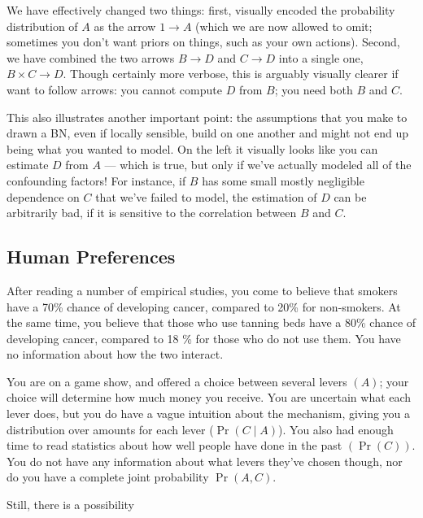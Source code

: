 \documentclass{article}
\begin{document}
	We have effectively changed two things: first, visually encoded the probability distribution of $A$ as the arrow $1 \to A$ (which we are now allowed to omit; sometimes you don't want priors on things, such as your own actions). Second, we have combined the two arrows $B \to D$ and $C \to D$ into a single one, $B \times C \to D$. Though certainly more verbose, this is arguably visually clearer if want to follow arrows: you cannot compute $D$ from $B$; you need both $B$ and $C$.
	
	This also illustrates another important point: the assumptions that you make to drawn a BN, even if locally sensible, build on one another and might not end up being what you wanted to model. On the left it visually looks like you can estimate $D$ from
	$A$ --- which is true, but only if we've actually modeled all of the confounding factors! For instance, if $B$ has some small mostly negligible dependence on $C$ that we've failed to model, the estimation of $D$ can be arbitrarily bad, if it is sensitive to the correlation between $B$ and $C$.
	
	\subsection{Human Preferences}
	\begin{example}
		After reading a number of empirical studies, you come to believe that smokers have a 70\% chance of developing cancer, compared to 20\% for non-smokers. At the same time, you believe that those who use tanning beds have a 80\% chance of developing cancer, compared to 18 \% for those who do not use them. You have no information about how the two interact.
	\end{example}
	
	\begin{example}
		You are on a game show, and offered a choice between several levers $(A)$; your choice will determine how much money you receive. You are uncertain what each lever does, but you do have a vague intuition about the mechanism, giving you a distribution over amounts for each lever ($\Pr(C \mid A)$). You also had enough time to read statistics about how well people have done in the past $(\Pr(C))$. You do not have any information about what levers they've chosen though, nor do you have a complete joint probability $\Pr(A, C)$. 
		
		Still, there is a possibility
	\end{example}
\end{document}
